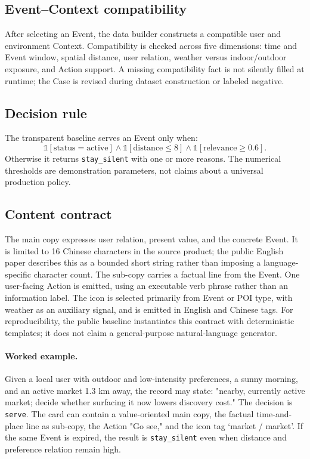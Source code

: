 \documentclass[10pt]{article}
\newcommand{\silent}{\texttt{stay\_silent}}
\newcommand{\serve}{\texttt{serve}}
\begin{document}
\subsection{Event--Context compatibility}

After selecting an Event, the data builder constructs a compatible user and environment Context. Compatibility is checked across five dimensions: time and Event window, spatial distance, user relation, weather versus indoor/outdoor exposure, and Action support. A missing compatibility fact is not silently filled at runtime; the Case is revised during dataset construction or labeled negative.

\subsection{Decision rule}

The transparent baseline serves an Event only when:
\begin{equation}
  \mathbb{1}[\text{status}=\text{active}]\land
  \mathbb{1}[\text{distance}\leq 8]\land
  \mathbb{1}[\text{relevance}\geq 0.6].
\end{equation}
Otherwise it returns \silent{} with one or more reasons. The numerical thresholds are demonstration parameters, not claims about a universal production policy.

\subsection{Content contract}

The main copy expresses user relation, present value, and the concrete Event. It is limited to 16 Chinese characters in the source product; the public English paper describes this as a bounded short string rather than imposing a language-specific character count. The sub-copy carries a factual line from the Event. One user-facing Action is emitted, using an executable verb phrase rather than an information label. The icon is selected primarily from Event or POI type, with weather as an auxiliary signal, and is emitted in English and Chinese tags. For reproducibility, the public baseline instantiates this contract with deterministic templates; it does not claim a general-purpose natural-language generator.

	\paragraph{Worked example.}
Given a local user with outdoor and low-intensity preferences, a sunny morning, and an active market 1.3 km away, the record may state: "nearby, currently active market; decide whether surfacing it now lowers discovery cost." The decision is \serve{}. The card can contain a value-oriented main copy, the factual time-and-place line as sub-copy, the Action "Go see," and the icon tag `market / market'. If the same Event is expired, the result is \silent{} even when distance and preference relation remain high.
\end{document}

